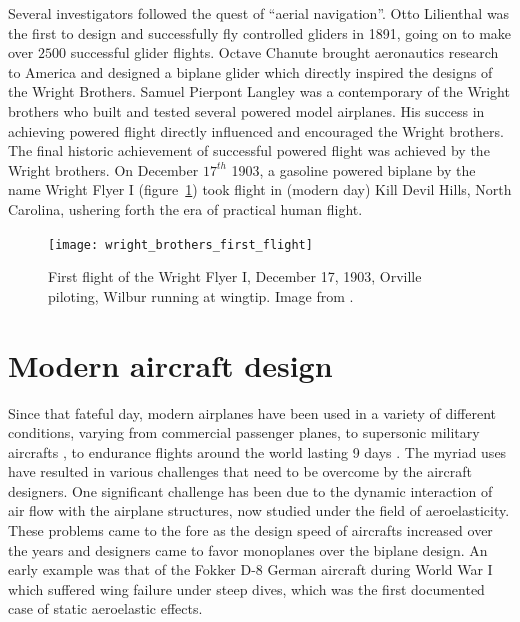 Several investigators followed the quest of ``aerial navigation''. Otto Lilienthal was the first to design and successfully fly controlled gliders in 1891, going on to make over $2500$ successful glider flights. Octave Chanute brought aeronautics research to America and designed a biplane glider which directly inspired the designs of the Wright Brothers. Samuel Pierpont Langley was a contemporary of the Wright brothers who built and tested several powered model airplanes. His success in achieving powered flight directly influenced and encouraged the Wright brothers. The final historic achievement of successful powered flight was achieved by the Wright brothers. On December $17^{th}$ 1903, a gasoline powered biplane by the name Wright Flyer I (figure~\ref{fig:wright_flight}) took flight in (modern day) Kill Devil Hills, North Carolina, ushering forth the era of practical human flight.
\begin{figure}[h]
	\centering
	\texttt{[image: wright\_brothers\_first\_flight]}
	\vspace{10pt}	
	\caption{First flight of the Wright Flyer I, December 17, 1903, Orville piloting, Wilbur running at wingtip. Image from \cite{wikipedia_wright}.}
	\label{fig:wright_flight}
\end{figure}

\section{Modern aircraft design}
Since that fateful day, modern airplanes have been used in a variety of different conditions, varying from commercial passenger planes, to supersonic military aircrafts \citep{blackbird}, 
to endurance flights around the world lasting 9 days \citep{rutan_voyager}. The myriad uses have resulted in various challenges that need to be overcome by the aircraft designers. One significant challenge has been due to the dynamic interaction of air flow with the airplane structures, now studied under the field of aeroelasticity. These problems came to the fore as the design speed of aircrafts increased over the years and designers came to favor monoplanes over the biplane design. An early example was that of the Fokker D-8 German aircraft during World War I which suffered wing failure under steep dives, which was the first documented case of static aeroelastic effects.

